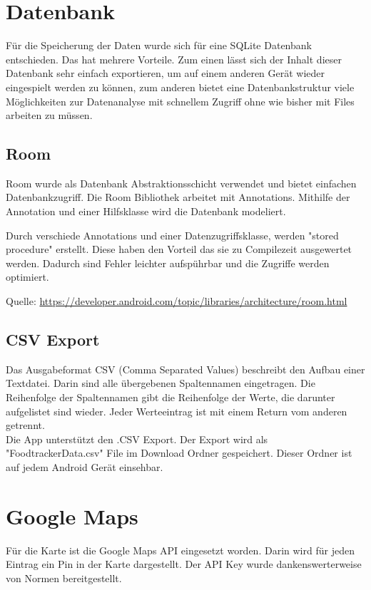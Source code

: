 \documentclass[
    DIV12,
    cleardouble=plain,
    headings=normal,
    pdftex,
    headexclude,footexclude,
    final
]{scrreprt}
\begin{document}
\section{Datenbank}
Für die Speicherung der Daten wurde sich für eine SQLite Datenbank entschieden. Das hat mehrere Vorteile. Zum einen lässt sich der Inhalt dieser Datenbank sehr einfach exportieren, um auf einem anderen Gerät wieder eingespielt werden zu können, zum anderen bietet eine Datenbankstruktur viele Möglichkeiten zur Datenanalyse mit schnellem Zugriff ohne wie bisher mit Files arbeiten zu müssen.

\subsection{Room}

Room wurde als Datenbank Abstraktionsschicht verwendet und bietet einfachen Datenbankzugriff. Die Room Bibliothek arbeitet mit Annotations. Mithilfe der Annotation und einer Hilfsklasse wird die Datenbank modeliert. 


\newpage
Durch verschiede Annotations und einer Datenzugriffsklasse, werden "stored procedure" erstellt.
Diese haben den Vorteil das sie zu Compilezeit ausgewertet werden. Dadurch sind Fehler leichter aufspührbar und die Zugriffe werden optimiert.




Quelle:
\url{https://developer.android.com/topic/libraries/architecture/room.html}


\subsection{CSV Export}
Das Ausgabeformat CSV (Comma Separated Values) beschreibt den Aufbau einer Textdatei. Darin sind alle übergebenen Spaltennamen eingetragen. Die Reihenfolge der Spaltennamen gibt die Reihenfolge der Werte, die darunter aufgelistet sind wieder. Jeder Werteeintrag ist mit einem Return vom anderen getrennt.\\
Die App unterstützt den .CSV Export. Der Export wird als "FoodtrackerData.csv" File im Download Ordner gespeichert.
Dieser Ordner ist auf jedem Android Gerät einsehbar.



\section{Google Maps}
Für die Karte ist die Google Maps API eingesetzt worden. Darin wird für jeden Eintrag ein Pin in der Karte dargestellt.
Der API Key wurde dankenswerterweise von Normen bereitgestellt.
\end{document}
